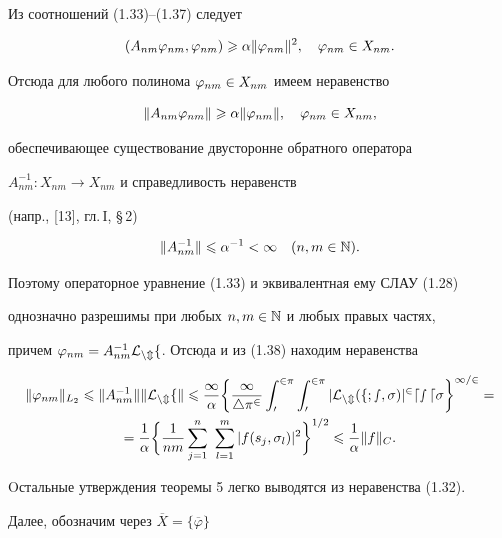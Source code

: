 Из соотношений (1.33)--(1.37) следует


$$


(A_{nm}\vp_{nm},\vp_{nm})\gea \alpha\|\vp_{nm}\|^2, \quad \vp_{nm}\in X_{nm}.


$$


Отсюда для любого полинома $\varphi_{nm}\in X_{nm}$ имеем неравенство


$$


\|A_{nm}\vp_{nm}\|\gea \alpha\|\vp_{nm}\|,\quad \vp_{nm}\in X_{nm},


$$


обеспечивающее существование двусторонне обратного оператора 


$A_{nm}^{-1}:X_{nm}\to X_{nm}$ и справедливость неравенств 


(напр., [13], гл.\,I, \S\,2)


\begin{equation}


\|A_{nm}^{-1}\|\lea \alpha^{-1}<\infty\quad (n,m\in \N).


\end{equation}


Поэтому операторное уравнение (1.33) и эквивалентная ему СЛАУ (1.28) 


однозначно разрешимы при любых $n,m \in \Bbb N$ и любых правых частях, 


причем $\varphi_{nm} = A_{nm}^{-1}\cal L_{nm}f$. Отсюда и из (1.38) находим неравенства


\begin{gather*}


\|\vp_{nm}\|_{L_2}\lea \|A_{nm}^{-1}\|\|\rL_{nm}f\|\lea \frac{1}{\alpha}\bigg\{


\frac{1}{4\pi^2}\int_0^{2\pi}\int_0^{2\pi}|\rL_{nm}(f;s,\si)|^2ds\, d\si


\bigg\}^{1/2}=\\


%


=\frac{1}{\alpha}\bigg\{\frac{1}{nm}\sum_{j=1}^n\ \sum_{l=1}^m|f(s_j,\si_l)|^2


\bigg\}^{1/2}\lea \frac{1}{\alpha}\|f\|_{C}.


\end{gather*}





Oстальные утверждения теоремы 5 легко выводятся из неравенства (1.32).





Далее, обозначим через $\overline{X}=\{ \overline{\varphi }\}$


